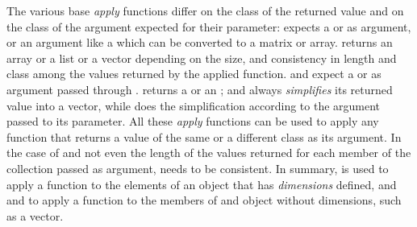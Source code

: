 \documentclass[krantz2]{krantz}\usepackage{knitr}%
\begin{document}
The various base \Rlang \emph{apply} functions differ on the class of the returned value and on the class of the argument expected for their  parameter:  expects a  or  as argument, or an argument like a  which can be converted to a matrix or array.  returns an array or a list or a vector depending on the size, and consistency in length and class among the values returned by the applied function.  and  expect a  or  as argument passed through .  returns a  or an ; and  always \emph{simplifies} its returned value into a vector, while  does the simplification according to the argument passed to its  parameter. All these \emph{apply} functions can be used to apply any \Rlang function that returns a value of the same or a different class as its argument. In the case of  and  not even the length of the values returned for each member of the collection passed as argument, needs to be consistent. In summary,  is used to apply a function to the elements of an object that has \emph{dimensions} defined, and  and  to apply a function to the members of and object without dimensions, such as a vector.
\end{document}
